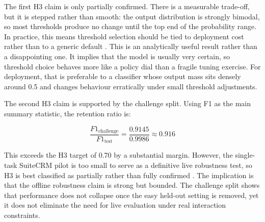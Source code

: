 \documentclass[12pt,a4paper]{article}
\begin{document}
The first H3 claim is only partially confirmed. There is a measurable
trade-off, but it is stepped rather than smooth: the output distribution is
strongly bimodal, so most thresholds produce no change until the top end of the
probability range. In practice, this means threshold selection should be tied to
deployment cost rather than to a generic default \citep{saito2015prcurve}. This
is an analytically useful result rather than a disappointing one. It implies
that the model is usually very certain, so threshold choice behaves more like a
policy dial than a fragile tuning exercise. For deployment, that is preferable
to a classifier whose output mass sits densely around 0.5 and changes behaviour
erratically under small threshold adjustments.

The second H3 claim is supported by the challenge split. Using F1 as the main
summary statistic, the retention ratio is:

\begin{equation}
\frac{F1_{\text{challenge}}}{F1_{\text{test}}} =
\frac{0.9145}{0.9986} \approx 0.916
\end{equation}

This exceeds the H3 target of 0.70 by a substantial margin. However, the
single-task SuiteCRM pilot is too small to serve as a definitive live robustness
test, so H3 is best classified as partially rather than fully confirmed
\citep{wohlin2012experimentation,venable2016feds}. The implication is that the
offline robustness claim is strong but bounded. The challenge split shows that
performance does not collapse once the easy held-out setting is removed, yet it
does not eliminate the need for live evaluation under real interaction
constraints.
\end{document}
